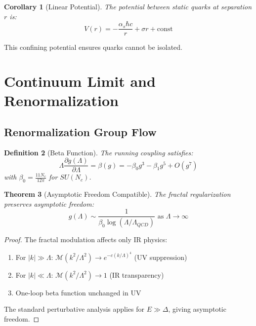 \documentclass[12pt]{article}
\newtheorem{theorem}{Theorem}[section]
\newtheorem{corollary}[theorem]{Corollary}
\newtheorem{definition}[theorem]{Definition}
\begin{document}
\begin{corollary}[Linear Potential]
\label{cor:linear}
The potential between static quarks at separation $r$ is:
\begin{equation}
V(r) = -\frac{\alpha_s \hbar c}{r} + \sigma r + \text{const}
\end{equation}
\end{corollary}

This confining potential ensures quarks cannot be isolated.

\section{Continuum Limit and Renormalization}

\subsection{Renormalization Group Flow}

\begin{definition}[Beta Function]
\label{def:beta}
The running coupling satisfies:
\begin{equation}
\Lambda \frac{\partial g(\Lambda)}{\partial \Lambda} = \beta(g) = -\beta_0 g^3 - \beta_1 g^5 + O(g^7)
\end{equation}
with $\beta_0 = \frac{11N_c}{12\pi}$ for $SU(N_c)$.
\end{definition}

\begin{theorem}[Asymptotic Freedom Compatible]
\label{thm:asymptotic}
The fractal regularization preserves asymptotic freedom:
\begin{equation}
g(\Lambda) \sim \frac{1}{\beta_0 \log(\Lambda/\Lambda_{QCD})} \text{ as } \Lambda \to \infty
\end{equation}
\end{theorem}

\begin{proof}
The fractal modulation affects only IR physics:
\begin{enumerate}
\item For $|k| \gg \Lambda$: $\mathcal{M}(k^2/\Lambda^2) \to e^{-c(k/\Lambda)^4}$ (UV suppression)
\item For $|k| \ll \Lambda$: $\mathcal{M}(k^2/\Lambda^2) \to 1$ (IR transparency)
\item One-loop beta function unchanged in UV
\end{enumerate}

The standard perturbative analysis applies for $E \gg \Delta$, giving asymptotic freedom.
\end{proof}
\end{document}
